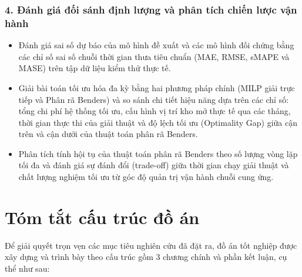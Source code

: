 \subsubsection{\large 4. Đánh giá đối sánh định lượng và phân tích chiến lược vận hành}
\begin{itemize}
    \item Đánh giá sai số dự báo của mô hình đề xuất và các mô hình đối chứng bằng các chỉ số sai số chuỗi thời gian thưa tiêu chuẩn (MAE, RMSE, sMAPE và MASE) trên tập dữ liệu kiểm thử thực tế.
    \item Giải bài toán tối ưu hóa đa kỳ bằng hai phương pháp chính (MILP giải trực tiếp và Phân rã Benders) và so sánh chi tiết hiệu năng dựa trên các chỉ số: tổng chi phí hệ thống tối ưu, cấu hình vị trí kho mở thực tế qua các tháng, thời gian thực thi của giải thuật và độ lệch tối ưu (Optimality Gap) giữa cận trên và cận dưới của thuật toán phân rã Benders.
    \item Phân tích tính hội tụ của thuật toán phân rã Benders theo số lượng vòng lặp tối đa và đánh giá sự đánh đổi (trade-off) giữa thời gian chạy giải thuật và chất lượng nghiệm tối ưu từ góc độ quản trị vận hành chuỗi cung ứng.
\end{itemize}

\section{Tóm tắt cấu trúc đồ án}

Để giải quyết trọn vẹn các mục tiêu nghiên cứu đã đặt ra, đồ án tốt nghiệp được xây dựng và trình bày theo cấu trúc gồm 3 chương chính và phần kết luận, cụ thể như sau:

